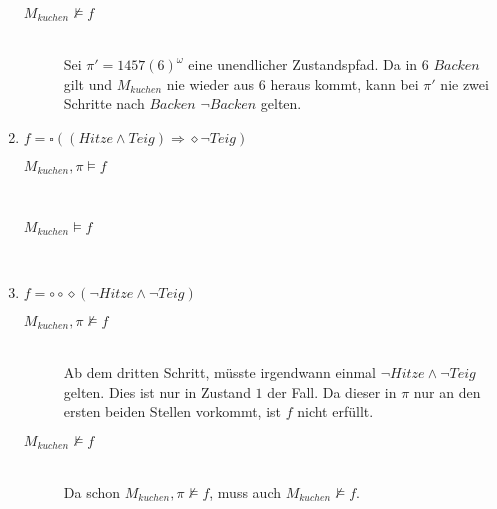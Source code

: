 \documentclass[a4paper]{scrartcl}
\begin{document}
\begin{enumerate}
\begin{description}
            \item[$M_{kuchen} \not\models f$] \hfill \\
                Sei $\pi' = 1457(6)^\omega$ eine unendlicher Zustandspfad.
                Da in $6$ $Backen$ gilt und $M_{kuchen}$ nie wieder aus $6$
                heraus kommt, kann bei $\pi'$ nie zwei Schritte nach $Backen$
                $\lnot Backen$ gelten.

        \end{description}

    \item $f = \square((Hitze \land Teig) \Rightarrow \diamond\lnot Teig)$
        \begin{description}
            \item[$M_{kuchen}, \pi \models f$] \hfill \\

            \item[$M_{kuchen} \models f$] \hfill \\

        \end{description}

    \item $f = \circ\circ\diamond(\lnot Hitze \land \lnot Teig)$
        \begin{description}
            \item[$M_{kuchen}, \pi \not\models f$] \hfill \\
                Ab dem dritten Schritt, müsste irgendwann einmal
                $\lnot Hitze \land \lnot Teig$ gelten.
                Dies ist nur in Zustand $1$ der Fall.
                Da dieser in $\pi$ nur an den ersten beiden Stellen vorkommt,
                ist $f$ nicht erfüllt.

            \item[$M_{kuchen} \not\models f$] \hfill \\
                Da schon $M_{kuchen}, \pi \not\models f$, muss auch
                $M_{kuchen} \not\models f$.

        \end{description}

\end{enumerate}
\end{document}
